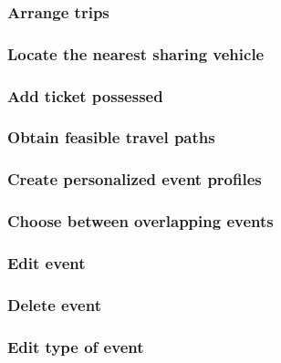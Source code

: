	\subsubsection{Arrange trips}
			
		
	\subsubsection{Locate the nearest sharing vehicle}
			
		
	\subsubsection{Add ticket possessed}
			
	
	\subsubsection{Obtain feasible travel paths}
			
	
	\subsubsection{Create personalized event profiles}
		
	
	\subsubsection{Choose between overlapping events}
		
		
		\subsubsection{Edit event}
		
		
		\subsubsection{Delete event}
		
		
		\subsubsection{Edit type of event}
		
		
